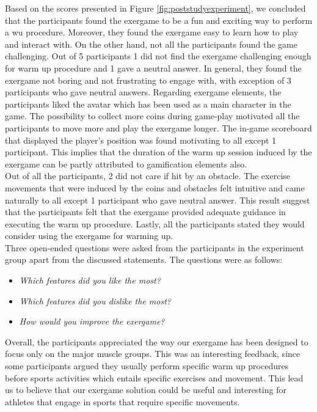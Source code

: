 Based on the scores presented in Figure \ref{fig:poststudyexperiment}, we concluded that the participants found the exergame to be a fun and exciting way to perform a \acrshort{wu} procedure. Moreover, they found the exergame easy to learn how to play and interact with. On the other hand, not all the participants found the game challenging. Out of 5 participants 1 did not find the exergame challenging enough for warm up procedure and 1 gave a neutral answer. In general, they found the exergame not boring and not frustrating to engage with, with exception of 3 participants who gave neutral answers.  Regarding exergame elements, the participants liked the avatar which has been used as a main character in the game. The possibility to collect more coins during game-play motivated all the participants to move more and play the exergame longer. The in-game scoreboard that displayed the player's position was found motivating to all except 1 participant. This implies that the duration of the warm up session induced by the exergame can be partly attributed to gamification elements also.\\ Out of all the participants, 2 did not care if hit by an obstacle. The exercise movements that were induced by the coins and obstacles felt intuitive and came naturally to all except 1 participant who gave neutral answer. This result suggest that the participants felt that the exergame provided adequate guidance in executing the warm up procedure. Lastly, all the participants stated they would consider using the exergame for warming up. \\Three open-ended questions were asked from the participants in the experiment group apart from the discussed statements. The questions were as follows:
\begin{itemize}
\item \textit{Which features did you like the most?}
\item \textit{Which features did you dislike the most?}
\item \textit{How would you improve the exergame?}
\end{itemize}
Overall, the participants appreciated the way our exergame has been designed to focus only on the major muscle groups. This was an interesting feedback, since some participants argued they usually perform specific warm up procedures before sports activities which entails specific exercises and movement. This lead us to believe that our exergame solution could be useful and interesting for athletes that engage in sports that require specific movements.
